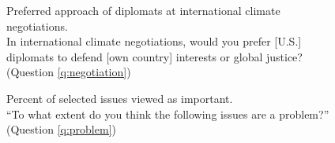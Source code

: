 

\begin{figure}[h!]
    \caption[Preferred approach for international climate negotiations]{Preferred approach of diplomats at international climate negotiations. \\ In international climate negotiations, would you prefer [U.S.] diplomats to defend [own country] interests or global justice? (Question \ref{q:negotiation})}\label{fig:negotiation}
\end{figure}

\begin{figure}[h!]
    \caption[Importance of selected issues]{Percent of selected issues viewed as important.\\ ``To what extent do you think the following issues are a problem?'' (Question \ref{q:problem})}\label{fig:problem}
\end{figure}

